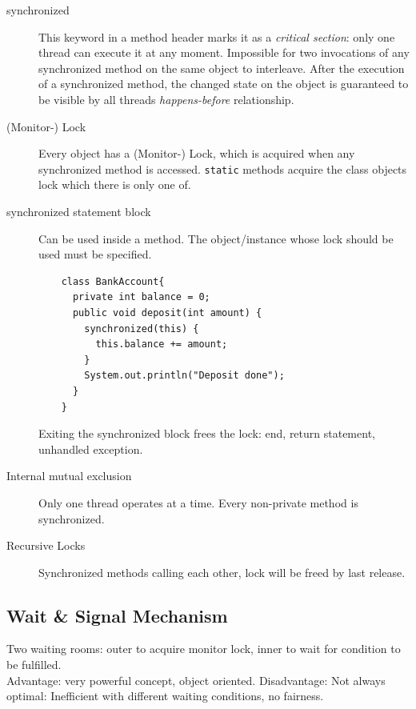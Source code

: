 \begin{description}
  \item[synchronized] This keyword in a method header marks it as a \textit{critical section}: only one thread can execute it at any moment. Impossible for two invocations of any synchronized method on the same object to interleave. After the execution of a synchronized method, the changed state on the object is guaranteed to be visible by all threads \textit{happens-before} relationship.
  \item[(Monitor-) Lock] Every object has a (Monitor-) Lock, which is acquired when any synchronized method is accessed. \verb|static| methods acquire the class objects lock which there is only one of.
  \item[synchronized statement block] Can be used inside a method. The object/instance whose lock should be used must be specified.
  \begin{verbatim}
    class BankAccount{
      private int balance = 0;
      public void deposit(int amount) {
        synchronized(this) {
          this.balance += amount;
        }
        System.out.println("Deposit done");
      }
    }
  \end{verbatim} 
  Exiting the synchronized block frees the lock: end, return statement, unhandled exception.
  \item[Internal mutual exclusion] Only one thread operates at a time. Every non-private method is synchronized.
  \item[Recursive Locks] Synchronized methods calling each other, lock will be freed by last release. 
\end{description} 

\subsection{Wait \& Signal Mechanism}
Two waiting rooms: outer to acquire monitor lock, inner to wait for condition to be fulfilled.\\

\noindent
Advantage: very powerful concept, object oriented. Disadvantage: Not always optimal: Inefficient with different waiting conditions, no fairness.

